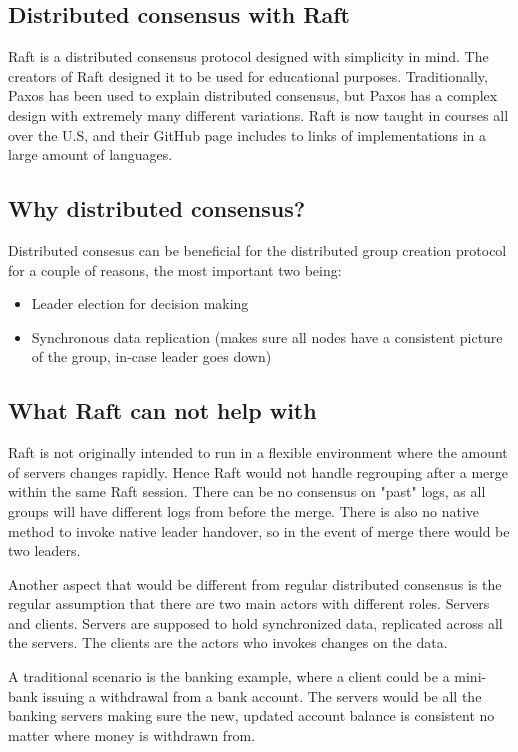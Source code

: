 \subsection{Distributed consensus with Raft}
Raft \cite{raftio} is a distributed consensus protocol designed with simplicity in mind. The creators of Raft designed it to be used for educational purposes. Traditionally, Paxos has been used to explain
distributed consensus, but Paxos has a complex design with extremely many different variations. Raft is now taught in courses all over the U.S, and their GitHub page includes to links
of implementations in a large amount of languages.

\subsection{Why distributed consensus?}
Distributed consesus can be beneficial for the distributed group creation protocol for a couple of reasons, the most important two being:
\begin{itemize}
	\item Leader election for decision making
	\item	Synchronous data replication (makes sure all nodes have a consistent picture of the group, in-case leader goes down)
\end{itemize}

\subsection{What Raft can not help with}
Raft is not originally intended to run in a flexible environment where the amount of servers changes rapidly. Hence Raft would not handle regrouping after a merge within the same Raft session.
There can be no consensus on "past" logs, as all groups will have different logs from before the merge. There is also no native method to invoke native leader handover, so in the event
of merge there would be two leaders. 

Another aspect that would be different from regular distributed consensus is the regular assumption that there are two main actors with different roles. Servers and clients. Servers are
supposed to hold synchronized data, replicated across all the servers. The clients are the actors who invokes changes on the data.

A traditional scenario is the banking example, where a client could be a mini-bank issuing a withdrawal from a bank account. The servers would be all the banking servers making sure the new,
updated account balance is consistent no matter where money is withdrawn from. 


